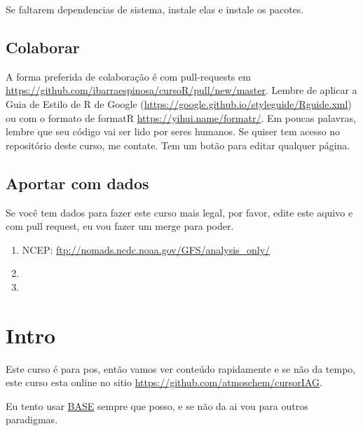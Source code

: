 \documentclass[]{book}
\begin{document}
Se faltarem dependencias de sistema, instale elas e instale os pacotes.

\section{Colaborar}\label{colaborar}

A forma preferida de colaboração é com pull-requests em
\url{https://github.com/ibarraespinosa/cursoR/pull/new/master}. Lembre
de aplicar a Guia de Estilo de R de Google
(\url{https://google.github.io/styleguide/Rguide.xml}) ou com o formato
de formatR \url{https://yihui.name/formatr/}. Em poucas palavras, lembre
que seu código vai ser lido por seres humanos. Se quiser tem acesso no
repositório deste curso, me contate. Tem um botão para editar qualquer
página.

\section{Aportar com dados}\label{aportar-com-dados}

Se você tem dados para fazer este curso mais legal, por favor, edite
este aquivo e com pull request, eu vou fazer um merge para poder.

\begin{enumerate}
\def\labelenumi{\arabic{enumi}.}
\item
  NCEP: \url{ftp://nomads.ncdc.noaa.gov/GFS/analysis_only/}
\item
\item
\end{enumerate}

\chapter{Intro}\label{intro}

Este curso é para pos, então vamos ver conteúdo rapidamente e se não da
tempo, este curso esta online no sitio
\url{https://github.com/atmoschem/cursorIAG}.

Eu tento usar
\href{http://stat.ethz.ch/R-manual/R-devel/library/base/html/00Index.html}{BASE}
sempre que posso, e se não da ai vou para outros paradigmas.
\end{document}
